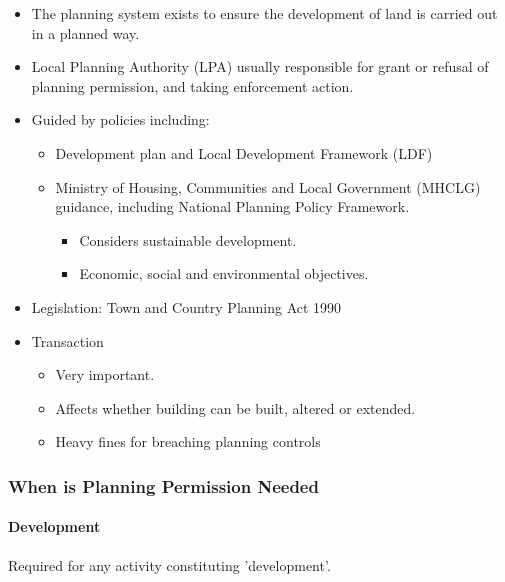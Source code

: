 \documentclass[
]{article}
\providecommand{\tightlist}{%
  \setlength{\itemsep}{0pt}\setlength{\parskip}{0pt}}
\begin{document}
\begin{itemize}
\tightlist
\item
  The planning system exists to ensure the development of land is
  carried out in a planned way.
\item
  Local Planning Authority (LPA) usually responsible for grant or
  refusal of planning permission, and taking enforcement action.
\item
  Guided by policies including:

  \begin{itemize}
  \tightlist
  \item
    Development plan and Local Development Framework (LDF)
  \item
    Ministry of Housing, Communities and Local Government (MHCLG)
    guidance, including National Planning Policy Framework.

    \begin{itemize}
    \tightlist
    \item
      Considers sustainable development.
    \item
      Economic, social and environmental objectives.
    \end{itemize}
  \end{itemize}
\item
  Legislation: Town and Country Planning Act 1990
\item
  Transaction

  \begin{itemize}
  \tightlist
  \item
    Very important.
  \item
    Affects whether building can be built, altered or extended.
  \item
    Heavy fines for breaching planning controls
  \end{itemize}
\end{itemize}

\hypertarget{when-is-planning-permission-needed}{%
\subsubsection{When is Planning Permission
Needed}\label{when-is-planning-permission-needed}}

\hypertarget{development}{%
\paragraph{Development}\label{development}}

Required for any activity constituting 'development'.
\end{document}
